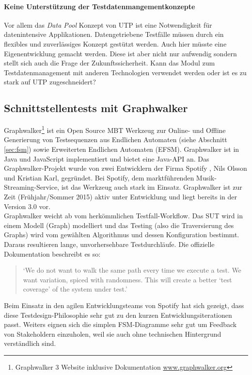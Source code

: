 \paragraph{Keine Unterstützung der Testdatenmangementkonzepte}
Vor allem das \textit{Data Pool} Konzept von UTP ist eine Notwendigkeit für datenintensive Applikationen. Datengetriebene Testfälle müssen durch ein flexibles und zuverlässiges Konzept gestützt werden. Auch hier müsste eine Eigenentwicklung gemacht werden. Diese ist aber nicht nur aufwendig sondern stellt sich auch die Frage der Zukunftssicherheit. Kann das Modul zum Testdatenmanagement mit anderen Technologien verwendet werden oder ist es zu stark auf UTP zugeschneidert?

\subsection{Schnittstellentests mit Graphwalker}
\label{sec:graphwalker}
Graphwalker\footnote{Graphwalker 3 Website inklusive Dokumentation \url{www.graphwalker.org}} ist ein Open Source MBT Werkzeug zur Online- und Offline Generierung von Testsequenzen aus Endlichen Automaten (siehe Abschnitt \ref{sec:fsm}) sowie Erweiterten Endlichen Automaten (EFSM). Graphwalker ist in Java und JavaScript implementiert und bietet eine Java-API an. Das Graphwalker-Projekt wurde von zwei Entwicklern der Firma Spotify , Nils Olsson und Kristian Karl, gegründet. Bei Spotify, dem marktführenden Musik-Streaming-Service, ist das Werkzeug auch stark im Einsatz. Graphwalker ist zur Zeit (Frühjahr/Sommer 2015) aktiv unter Entwicklung und liegt bereits in der Version 3.0 vor.\\
Graphwalker weicht ab vom herkömmlichen Testfall-Workflow. Das SUT wird in einem Modell (Graph) modelliert und das Testing (also die Traversierung des Graphs) wird vom gewählten Algorithmus und dessen Konfiguration bestimmt. Daraus resultieren lange, unvorhersehbare Testdurchläufe. Die offizielle Dokumentation beschreibt es so:

\begin{quote}
`We do not want to walk the same path every time we execute a test. We want variation, spiced with randomness. This will create a better `test coverage' of the system under test.'\cite{_graphwalker_2015}
\end{quote}

Beim Einsatz in den agilen Entwicklungsteams von Spotify hat sich gezeigt, dass diese Testdesign-Philosophie sehr gut zu den kurzen Entwicklungsiterationen passt. Weiters eignen sich die simplen FSM-Diagramme  sehr gut um Feedback von Stakeholdern einzuholen, weil sie auch ohne technischen Hintergrund verständlich sind.

